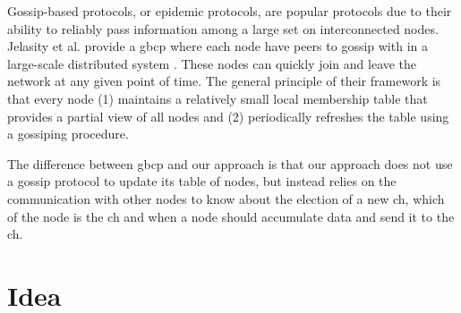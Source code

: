\documentclass[USenglish]{uit-thesis}
\begin{document}


Gossip-based protocols, or epidemic protocols, are popular protocols due to their ability to reliably pass information among a large set on interconnected nodes. Jelasity et al. \cite{gbsampling} provide a \gls{gbcp} where each node have peers to gossip with in a large-scale distributed system \cite{demers}. These nodes can quickly join and leave the network at any given point of time. The general principle of their framework is that every node (1) maintains a relatively small local membership table that provides a partial view of all nodes and (2) periodically refreshes the table using a gossiping procedure.

The difference between \gls{gbcp} and our approach is that our approach does not use a gossip protocol to update its table of nodes, but instead relies on the communication with other nodes to know about the election of a new \gls{ch}, which of the node is the \gls{ch} and when a node should accumulate data and send it to the \gls{ch}.


\chapter{Idea} \label{chap:idea}



\end{document}
